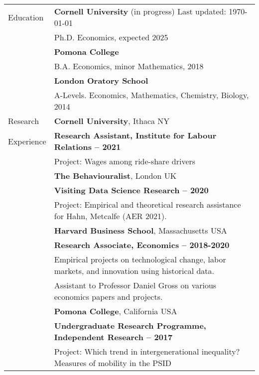 \documentclass[letterpaper,11pt,oneside]{article}
\begin{document}
\noindent \begin{longtable}{@{} l l}
\Large{Education}
    & \textbf{Cornell University} (in progress)  \hfill Last updated: \today \\
    &  Ph.D. Economics, expected 2025 \vspace{0.1cm} \\
    & \textbf{Pomona College} \\
    &  B.A. Economics, minor Mathematics, 2018 \\
    &  \textbf{London Oratory School}\\
    &  A-Levels. Economics, Mathematics, Chemistry, Biology, 2014 \vspace{0.2cm} \\

\Large{Research}
    & \textbf{Cornell University}, Ithaca NY \\
\Large{Experience}
    & \textbf{Research Assistant, Institute for Labour Relations -- 2021} \\
    & Project: Wages among ride-share drivers \vspace{0.2cm} \\
    
    & \textbf{The Behaviouralist}, London UK \\
    & \textbf{Visiting Data Science Research -- 2020} \\
    & Project: Empirical and theoretical research assistance for Hahn, Metcalfe (AER 2021). \vspace{0.2cm} \\

    & \textbf{Harvard Business School}, Massachusetts USA \\
    & \textbf{Research Associate, Economics -- 2018-2020} \\
    & Empirical projects on technological change, labor markets, and innovation using historical data.\\
    & Assistant to Professor Daniel Gross on various economics papers and projects. \vspace{0.2cm} \\
    
    & \textbf{Pomona College}, California USA \\
    & \textbf{Undergraduate Research Programme, Independent Research -- 2017} \\
    & Project: Which trend in intergenerational inequality?  Measures of mobility in the PSID \vspace{0.2cm} \\


\end{longtable}
\end{document}
